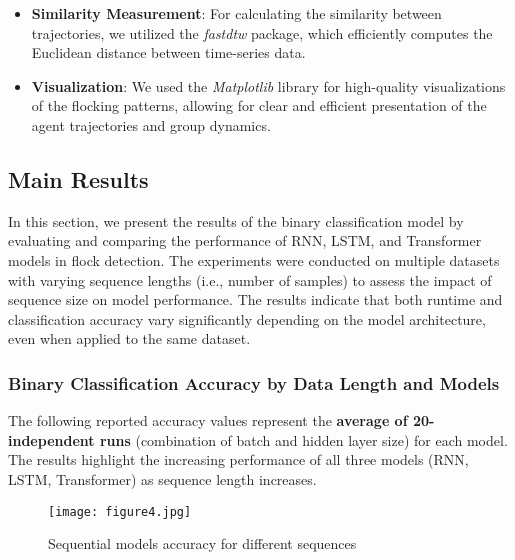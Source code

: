 \documentclass{article}
\begin{document}
\begin{itemize}
    \item \textbf{Similarity Measurement}: For calculating the similarity between trajectories, we utilized the \textit{fastdtw} package, which efficiently computes the Euclidean distance between time-series data.
\end{itemize}

\begin{itemize}
    \item \textbf{Visualization}: We used the \textit{Matplotlib} library for high-quality visualizations of the flocking patterns, allowing for clear and efficient presentation of the agent trajectories and group dynamics.
\end{itemize}


\subsection{Main Results}

In this section, we present the results of the binary classification model by evaluating and comparing the performance of RNN, LSTM, and Transformer models in flock detection. The experiments were conducted on multiple datasets with varying sequence lengths (i.e., number of samples) to assess the impact of sequence size on model performance. The results indicate that both runtime and classification accuracy vary significantly depending on the model architecture, even when applied to the same dataset.



\subsubsection{Binary Classification Accuracy by Data Length and Models}

The following reported accuracy values represent the \textbf{average of 20-independent runs} (combination of batch  and hidden layer size) for each model. The results highlight the increasing performance of all three models (RNN, LSTM, Transformer) as sequence length increases.


\begin{figure}[H] 
    \centering
    \ifpdf
        \texttt{[image: figure4.jpg]}  %
    \fi
    \caption{Sequential models accuracy for different sequences}
    \label{fig:model_accuracy}
\end{figure}
\end{document}
